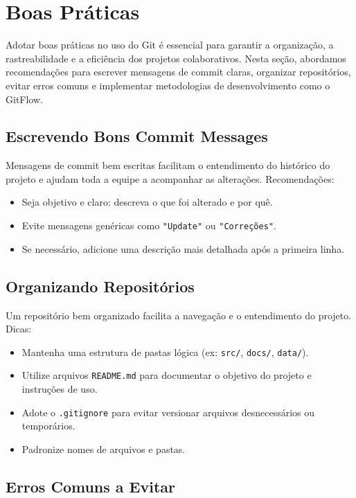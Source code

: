 \newpage
\section{Boas Práticas}

Adotar boas práticas no uso do Git é essencial para garantir a organização, a rastreabilidade e a eficiência dos projetos colaborativos. Nesta seção, abordamos recomendações para escrever mensagens de commit claras, organizar repositórios, evitar erros comuns e implementar metodologias de desenvolvimento como o GitFlow.

\subsection{Escrevendo Bons Commit Messages}

Mensagens de commit bem escritas facilitam o entendimento do histórico do projeto e ajudam toda a equipe a acompanhar as alterações. Recomendações:
\begin{itemize}
    \item Seja objetivo e claro: descreva o que foi alterado e por quê.
    \item Evite mensagens genéricas como \texttt{"Update"} ou \texttt{"Correções"}.
    \item Se necessário, adicione uma descrição mais detalhada após a primeira linha.
\end{itemize}

\subsection{Organizando Repositórios}

Um repositório bem organizado facilita a navegação e o entendimento do projeto. Dicas:
\begin{itemize}
    \item Mantenha uma estrutura de pastas lógica (ex: \texttt{src/}, \texttt{docs/}, \texttt{data/}).
    \item Utilize arquivos \texttt{README.md} para documentar o objetivo do projeto e instruções de uso.
    \item Adote o \texttt{.gitignore} para evitar versionar arquivos desnecessários ou temporários.
    \item Padronize nomes de arquivos e pastas.
\end{itemize}

\subsection{Erros Comuns a Evitar}

